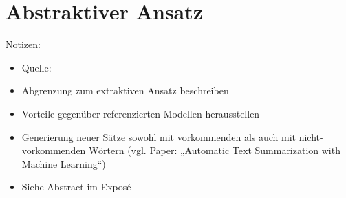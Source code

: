 \chapter{Abstraktiver Ansatz}
\thispagestyle{fancy}
\label{chap:Abstraktiver Ansatz}

Notizen:
\begin{itemize}
	\item Quelle: \cite{NIT19}
	\item Abgrenzung zum extraktiven Ansatz beschreiben
	\item Vorteile gegenüber referenzierten Modellen herausstellen
	\item Generierung neuer Sätze sowohl mit vorkommenden als auch mit nicht-vorkommenden Wörtern (vgl. Paper: „Automatic Text Summarization with Machine Learning“)
	\item Siehe Abstract im Exposé
\end{itemize}


